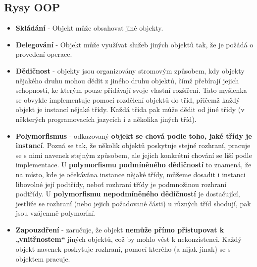 \subsection{Rysy OOP}
\begin{itemize}
\item \textbf{Skládání} - Objekt může obsahovat jiné objekty.
\item \textbf{Delegování} - Objekt může využívat služeb jiných objektů tak, že je požádá o provedení operace.
\item \textbf{Dědičnost} - objekty jsou organizovány stromovým způsobem, kdy objekty nějakého druhu mohou dědit z jiného druhu objektů, čímž přebírají jejich schopnosti, ke kterým pouze přidávají svoje vlastní rozšíření. Tato myšlenka se obvykle implementuje pomocí rozdělení objektů do tříd, přičemž každý objekt je instancí nějaké třídy. Každá třída pak může dědit od jiné třídy (v některých programovacích jazycích i z několika jiných tříd).
\item \textbf{Polymorfismus} - odkazovaný\textbf{ objekt se chová podle toho, jaké třídy je instancí}. Pozná se tak, že několik objektů poskytuje stejné rozhraní, pracuje se s nimi navenek stejným způsobem, ale jejich konkrétní chování se liší podle implementace. U \textbf{polymorfismu podmíněného dědičností} to znamená, že na místo, kde je očekávána instance nějaké třídy, můžeme dosadit i instanci libovolné její podtřídy, neboť rozhraní třídy je podmnožinou rozhraní podtřídy. U \textbf{polymorfismu nepodmíněného dědičností} je dostačující, jestliže se rozhraní (nebo jejich požadované části) u různých tříd shodují, pak jsou vzájemně polymorfní.
\item \textbf{Zapouzdření} - zaručuje, že objekt \textbf{nemůže přímo přistupovat k „vnitřnostem“} jiných objektů, což by mohlo vést k nekonzistenci. Každý objekt navenek poskytuje rozhraní, pomocí kterého (a nijak jinak) se s objektem pracuje.
\end{itemize}
